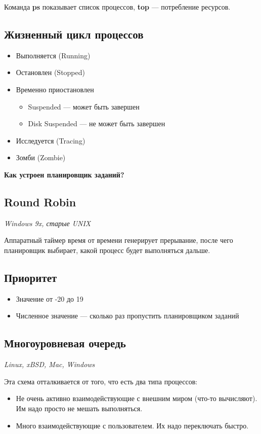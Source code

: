 Команда \textbf{ps} показывает список процессов, \textbf{top} --- потребление ресурсов.

\subsection{Жизненный цикл процессов}

\begin{itemize}
	\item Выполняется (Running)
	\item Остановлен (Stopped)
	\item Временно приостановлен
		\begin{itemize}
			\item Suspended --- может быть завершен
			\item Disk Suspended --- не может быть завершен
		\end{itemize}
	\item Исследуется (Tracing)
	\item Зомби (Zombie)
\end{itemize}

\textbf{Как устроен планировщик заданий?}

\subsection{Round Robin}
\textit{Windows 9x, старые UNIX}

Аппаратный таймер время от времени генерирует прерывание, после чего планировщик
выбирает, какой процесс будет выполняться дальше.

\subsection{Приоритет}

\begin{itemize}
	\item Значение от -20 до 19
	\item Численное значение --- сколько раз пропустить планировщиком заданий
\end{itemize}

\subsection{Многоуровневая очередь}
\textit{Linux, xBSD, Mac, Windows}

Эта схема отталкивается от того, что есть два типа процессов:
\begin{itemize}
	\item Не очень активно взаимодействующие с внешним миром (что-то вычисляют). 
	Им надо просто не мешать выполняться. 
	\item Много взаимодействующие с пользователем. Их надо переключать быстро.
\end{itemize}

